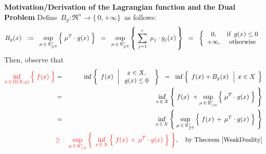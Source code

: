 \vskip 0.3cm
\noindent
\textbf{Motivation/Derivation of the Lagrangian function and the Dual Problem}
\vskip 0.2cm
\noindent
Define \,$B_{g} : \Re^{n} \longrightarrow \{\,0,+\infty\}$\, as follows:
\begin{equation*}
B_{g}(x)
\;\; := \;\;
	\underset{\mu\,\in\,\Re_{\geq 0}^{r}}{\sup}
	\left\{\;
		\mu^{T} \cdot \overset{{\color{white}.}}{g(x)}
		\;\right\}
\;\; = \;\;
	\underset{\mu\,\in\,\Re_{\geq 0}^{r}}{\sup}
	\left\{\;
		\overset{r}{\underset{j=1}{\sum}}\;\,\mu_{j} \cdot \overset{{\color{white}.}}{g_{j}(x)}
		\,\right\}
\;\; = \;\;
	\left\{\begin{array}{cc}
		0, & \textnormal{if \,$g(x) \leq 0$}
		\\
		+\infty, & \textnormal{otherwise}
		\end{array}\right.
\end{equation*}
Then, observe that
\begin{eqnarray*}
{\color{red}\underset{x\,\in\,\Omega(X,g)}{\inf}\left\{\;
	\overset{{\color{white}.}}{f(x)}
	\;\right\}}
& = &
	\inf
	\left\{\;\,
		\overset{{\color{white}.}}{f(x)}
		\,\;\left\vert\;
		\begin{array}{c}
			x \in X,
			\\
			g(x) \leq 0
			\end{array}
			\right.
		\;\right\}
\;\; = \;\;
	\inf
	\left\{\;\,
		\overset{{\color{white}.}}{f(x)} + B_{g}(x)
		\,\;\left\vert\;\,
			\overset{{\color{white}1}}{x} \in X
			\right.
		\;\right\}
\\
& = &
	\underset{x\,\in\,X}{\inf}
	\left\{\;
		\overset{{\color{white}.}}{f(x)}
		\; +  
		\underset{\mu\,\in\,\Re_{\geq 0}^{r}}{\sup}
			\left\{\;
			\mu^{T} \cdot \overset{{\color{white}.}}{g(x)}
			\;\right\}
		\;\right\}
\\
& = &
	\underset{x\,\in\,X}{\inf}
	\left\{\;
		 \underset{\mu\,\in\,\Re_{\geq 0}^{r}}{\sup}
			\left\{\;
			\overset{{\color{white}.}}{f(x)}
			\, + \,
			\mu^{T} \cdot \overset{{\color{white}.}}{g(x)}
			\;\right\}
		\;\right\}
\\
& {\color{red}\geq} &
	{\color{red}\underset{\mu\,\in\,\Re_{\geq 0}^{r}}{\sup}
	\left\{\;\,
		\underset{x\,\in\,X}{\inf}
			\left\{\;
			\overset{{\color{white}.}}{f(x)}
			\, + \,
			\mu^{T} \cdot \overset{{\color{white}.}}{g(x)}
			\;\right\}
		\;\right\}},
		\quad
		\textnormal{by Theorem \ref{WeakDuality}}
\end{eqnarray*}


